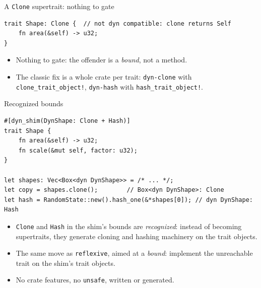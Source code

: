 \documentclass[aspectratio=169]{beamer}
\begin{document}

\begin{frame}[fragile]{A \texttt{Clone} supertrait: nothing to gate}
\begin{lstlisting}
trait Shape: Clone {  // not dyn compatible: clone returns Self
    fn area(&self) -> u32;
}
\end{lstlisting}
  \begin{itemize}
    \item Nothing to gate: the offender is a \emph{bound}, not a method.
    \item The classic fix is a whole crate per trait:
          \texttt{dyn-clone} with \texttt{clone\_trait\_object!},
          \texttt{dyn-hash} with \texttt{hash\_trait\_object!}.
  \end{itemize}
\end{frame}

\begin{frame}[fragile]{Recognized bounds}
\begin{lstlisting}
#[dyn_shim(DynShape: Clone + Hash)]
trait Shape {
    fn area(&self) -> u32;
    fn scale(&mut self, factor: u32);
}

let shapes: Vec<Box<dyn DynShape>> = /* ... */;
let copy = shapes.clone();        // Box<dyn DynShape>: Clone
let hash = RandomState::new().hash_one(&*shapes[0]); // dyn DynShape: Hash
\end{lstlisting}
  \begin{itemize}
    \item \texttt{Clone} and \texttt{Hash} in the shim's bounds are
          \emph{recognized}: instead of becoming supertraits, they generate
          cloning and hashing machinery on the trait objects.
    \item The same move as \texttt{reflexive}, aimed at a \emph{bound}:
          implement the unreachable trait on the shim's trait objects.
    \item No crate features, no \texttt{unsafe}, written or generated.
  \end{itemize}
\end{frame}
\end{document}
